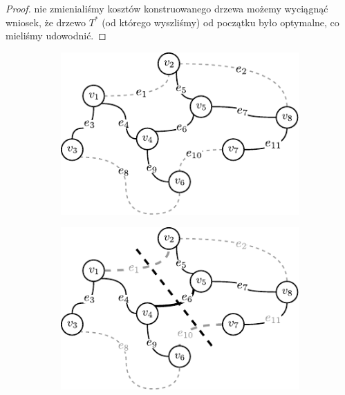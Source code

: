 \begin{proof}
nie zmienialiśmy kosztów konstruowanego drzewa możemy wyciągnąć wniosek, że drzewo $T^{\ast}$ (od którego wyszliśmy) od początku było optymalne, co mieliśmy udowodnić.
\end{proof}

\begin{figure}[!htbp]
	\null\hfill
	\begin{subfigure}[b]{0.32\textwidth}
		\includegraphics[width=\textwidth]{Chapter_I/CUT-example/a}
		\caption{}
		\label{fig:cut:a}
	\end{subfigure}
	\hfill
	\begin{subfigure}[b]{0.32\textwidth}
		\includegraphics[width=\textwidth]{Chapter_I/CUT-example/b}
		\caption{}
		\label{fig:cut:b}
	\end{subfigure}
	\hfill
	\begin{subfigure}[b]{0.32\textwidth}

\end{subfigure}
\end{figure}
